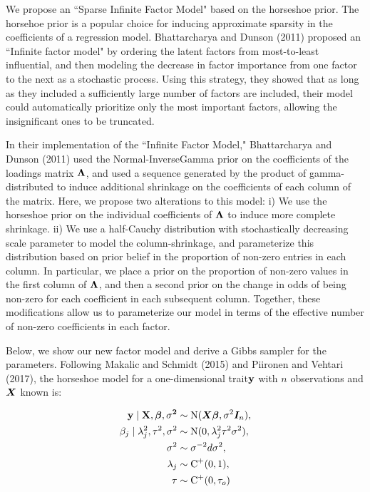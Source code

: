 \documentclass[11pt]{amsart}
\newcommand*{\B}[1]{\ifmmode\bm{#1}\else\textbf{#1}\fi}
\begin{document}
We propose an ``Sparse Infinite Factor Model" based on the horseshoe prior. 
The horsehoe prior is a popular choice for inducing approximate sparsity in the coefficients of a regression model. 
Bhattarcharya and Dunson (2011) proposed an ``Infinite factor model" by ordering the latent factors from most-to-least
influential, and then modeling the decrease in factor importance from one factor to the next as a stochastic process. Using this strategy,
they showed that as long as they included a sufficiently large number of factors are included, their model could automatically prioritize 
only the most important factors, allowing the insignificant ones to be truncated.

In their implementation of the ``Infinite Factor Model," Bhattarcharya and Dunson (2011) used the Normal-InverseGamma prior on the 
coefficients of the loadings matrix $\B\Lambda$, and used a sequence generated by the product of gamma-distributed to induce additional shrinkage on the coefficients of each column of the matrix. Here, we propose two alterations to this model: i) We use the horseshoe prior on the individual coefficients of $\B\Lambda$ to induce more complete shrinkage. ii) We use a half-Cauchy distribution with stochastically decreasing scale parameter to model the column-shrinkage, and parameterize this distribution based on prior belief in the proportion of non-zero entries in each column. In particular, we place a prior on the proportion of non-zero values in the first column of $\B\Lambda$, and then a second prior on the change in odds of being non-zero for each coefficient in each subsequent column. Together, these modifications allow us to parameterize our model in terms of the effective number of non-zero coefficients in each factor.

Below, we show our new factor model and derive a Gibbs sampler for the parameters.
Following Makalic and Schmidt (2015) and Piironen and Vehtari (2017), the horseshoe model for a one-dimensional trait$\bf y$  with $n$ observations and $\B X$ known is:

\begin{align}
\begin{split}
\label{horseshoe_regression}
\bf y \mid \B{X},\B{\beta},\sigma^2 &\sim \mbox{N}(\B{X\beta},\sigma^2\B{I}_n), \\
\beta_j \mid \lambda^2_j, \tau^2, \sigma^2 &\sim \mbox{N}(0,\lambda^2_j \tau^2 \sigma^2), \\
\sigma^2 &\sim \sigma^{-2}d\sigma^2, \\
\lambda_j &\sim \mbox{C}^+(0,1), \\
\tau &\sim \mbox{C}^+(0,\tau_o)
\end{split}
\end{align}
\end{document}
